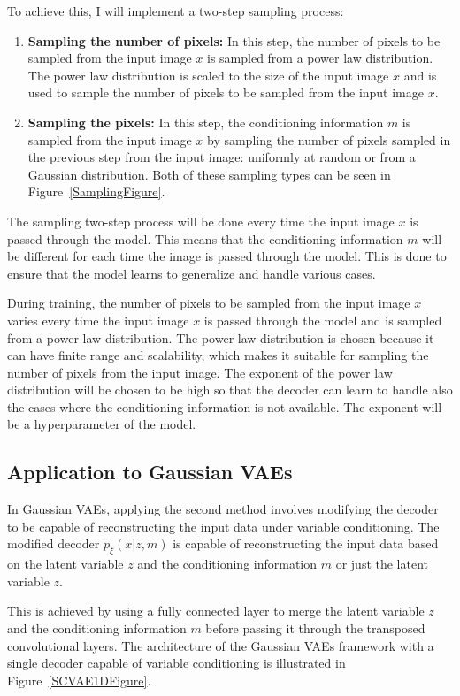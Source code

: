 To achieve this, I will implement a two-step sampling process:

\begin{enumerate}
    \item \textbf{Sampling the number of pixels:} In this step, the number of pixels to be sampled from the input image $x$ is sampled from a power law distribution. The power law distribution is scaled to the size of the input image $x$ and is used to sample the number of pixels to be sampled from the input image $x$.
    \item \textbf{Sampling the pixels:} In this step, the conditioning information $m$ is sampled from the input image $x$ by sampling the number of pixels sampled in the previous step from the input image: uniformly at random or from a Gaussian distribution. Both of these sampling types can be seen in Figure~\ref{SamplingFigure}.
\end{enumerate}

The sampling two-step process will be done every time the input image $x$ is passed through the model. This means that the conditioning information $m$ will be different for each time the image is passed through the model. This is done to ensure that the model learns to generalize and handle various cases.

During training, the number of pixels to be sampled from the input image $x$ varies every time the input image $x$ is passed through the model and is sampled from a power law distribution.
The power law distribution is chosen because it can have finite range and scalability, which makes it suitable for sampling the number of pixels from the input image. The exponent of the power law distribution will be chosen to be high so that the decoder can learn to handle also the cases where the conditioning information is not available. The exponent will be a hyperparameter of the model.


\subsection{Application to Gaussian VAEs}

In Gaussian VAEs, applying the second method involves modifying the decoder to
be capable of reconstructing the input data under variable conditioning. The
modified decoder $p_\xi(x|z,m)$ is capable of reconstructing the input data
based on the latent variable $z$ and the conditioning information $m$ or just
the latent variable $z$.

This is achieved by using a fully connected layer to merge the latent variable
$z$ and the conditioning information $m$ before passing it through the
transposed convolutional layers. The architecture of the Gaussian VAEs
framework with a single decoder capable of variable conditioning is illustrated
in Figure~\ref{SCVAE1DFigure}.

